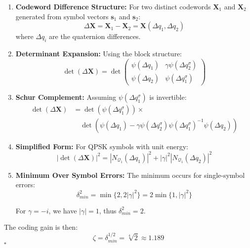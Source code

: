 \begin{enumerate}
    \item \textbf{Codeword Difference Structure:} For two distinct codewords $\mathbf{X}_1$ and $\mathbf{X}_2$ generated from symbol vectors $\mathbf{s}_1$ and $\mathbf{s}_2$:
    \begin{equation}
    \Delta\mathbf{X} = \mathbf{X}_1 - \mathbf{X}_2 = \mathbf{X}(\Delta q_1, \Delta q_2)
    \end{equation}
    where $\Delta q_i$ are the quaternion differences.
    
    \item \textbf{Determinant Expansion:} Using the block structure:
    \begin{equation}
    \det(\Delta\mathbf{X}) = \det\begin{pmatrix}
    \psi(\Delta q_1) & \gamma \psi(\Delta q_2^{\sigma}) \\
    \psi(\Delta q_2) & \psi(\Delta q_1^{\sigma})
    \end{pmatrix}
    \end{equation}
    
    \item \textbf{Schur Complement:} Assuming $\psi(\Delta q_1^{\sigma})$ is invertible:
    \begin{align}
    \det(\Delta\mathbf{X}) &= \det(\psi(\Delta q_1^{\sigma})) \times \\
    &\quad \det(\psi(\Delta q_1) - \gamma \psi(\Delta q_2^{\sigma})\psi(\Delta q_1^{\sigma})^{-1}\psi(\Delta q_2))
    \end{align}
    
    \item \textbf{Simplified Form:} For QPSK symbols with unit energy:
    \begin{equation}
    |\det(\Delta\mathbf{X})|^2 = |N_{\mathcal{Q}_1}(\Delta q_1)|^2 + |\gamma|^2 |N_{\mathcal{Q}_1}(\Delta q_2)|^2
    \end{equation}
    
    \item \textbf{Minimum Over Symbol Errors:} The minimum occurs for single-symbol errors:
    \begin{equation}
    \delta_{min}^2 = \min\{2, 2|\gamma|^2\} = 2\min\{1, |\gamma|^2\}
    \end{equation}
    
    For $\gamma = -i$, we have $|\gamma| = 1$, thus $\delta_{min}^2 = 2$.
\end{enumerate}

The coding gain is then:
\begin{equation}
\zeta = \delta_{min}^{1/2} = \sqrt[4]{2} \approx 1.189
\end{equation}
$\square$

